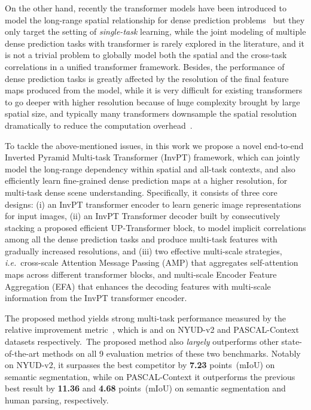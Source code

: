 \documentclass[runningheads]{llncs}
\newcommand*{\ie}{\emph{i.e.}}
\begin{document}
\par On the other hand, recently the transformer models have been introduced to model the long-range spatial relationship for dense prediction problems~\cite{dpt,hrformer} but they only target the setting of \emph{single-task} learning, while the joint modeling of multiple dense prediction tasks with transformer is rarely explored in the literature, and it is not a trivial problem to globally model both the spatial and the cross-task correlations in a unified transformer framework. Besides, the performance of dense prediction tasks is greatly affected by the resolution of the final feature maps produced from the model, while it is very difficult for existing transformers to go deeper with higher resolution because of huge complexity brought by large spatial size, and typically many transformers downsample the spatial resolution dramatically to reduce the computation overhead~\cite{vit,pvt}.


\par To tackle the above-mentioned issues, in this work we propose a novel end-to-end Inverted Pyramid Multi-task Transformer (InvPT) framework, which can jointly model the long-range dependency within spatial and all-task contexts, and also efficiently learn fine-grained dense prediction maps at a higher resolution, for multi-task dense scene understanding. Specifically, it consists of three core designs: (i) an InvPT transformer encoder to learn generic image representations for input images, (ii) an InvPT Transformer decoder built by consecutively stacking a proposed efficient UP-Transformer block, to model implicit correlations among all the dense prediction tasks and produce multi-task features with gradually increased resolutions, and (iii) two effective multi-scale strategies, \ie~cross-scale Attention Message Passing (AMP) that aggregates self-attention maps across different transformer blocks, and multi-scale Encoder Feature Aggregation (EFA) that {enhances the decoding features with multi-scale information from the InvPT transformer encoder}.
\par The proposed method yields strong multi-task performance measured by the relative improvement metric~\cite{astmt}, which is { and } on NYUD-v2 and PASCAL-Context datasets respectively.~The proposed method also \emph{largely} outperforms other state-of-the-art methods on all 9 evaluation metrics of these two benchmarks. Notably on NYUD-v2, it surpasses the best competitor by \textbf{7.23} {points}~(mIoU) on semantic segmentation, while on PASCAL-Context it outperforms the previous best result by \textbf{11.36} and \textbf{4.68} points~(mIoU) on semantic segmentation and human parsing, respectively.
\end{document}
